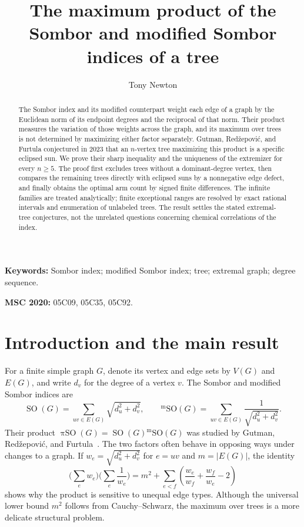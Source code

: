 \documentclass[11pt,a4paper]{article}
\title{The maximum product of the Sombor and modified Sombor indices of a tree}
\author{Tony Newton}
\date{}
\numberwithin{equation}{section}
\newcommand{\somb}{\operatorname{SO}}
\newcommand{\msomb}{\operatorname{{}^m SO}}
\newcommand{\prodso}{\operatorname{\pi SO}}
\begin{document}
\maketitle
\vspace{-2.0em}
\begin{abstract}
The Sombor index and its modified counterpart weight each edge of a graph by the Euclidean norm of its endpoint degrees and the reciprocal of that norm. Their product measures the variation of those weights across the graph, and its maximum over trees is not determined by maximizing either factor separately. Gutman, Red\v{z}epovi\'{c}, and Furtula conjectured in 2023 that an $n$-vertex tree maximizing this product is a specific eclipsed sun. We prove their sharp inequality and the uniqueness of the extremizer for every $n\geq5$. The proof first excludes trees without a dominant-degree vertex, then compares the remaining trees directly with eclipsed suns by a nonnegative edge defect, and finally obtains the optimal arm count by signed finite differences. The infinite families are treated analytically; finite exceptional ranges are resolved by exact rational intervals and enumeration of unlabeled trees. The result settles the stated extremal-tree conjectures, not the unrelated questions concerning chemical correlations of the index.
\end{abstract}
\noindent\textbf{Keywords:} Sombor index; modified Sombor index; tree; extremal graph; degree sequence.\par
\noindent\textbf{MSC 2020:} 05C09, 05C35, 05C92.

\section{Introduction and the main result}
For a finite simple graph $G$, denote its vertex and edge sets by $V(G)$ and $E(G)$, and write $d_v$ for the degree of a vertex $v$. The Sombor and modified Sombor indices are
\begin{equation}\label{eq:indices}
\somb(G)=\sum_{uv\in E(G)}\sqrt{d_u^2+d_v^2},\qquad
\msomb(G)=\sum_{uv\in E(G)}\frac1{\sqrt{d_u^2+d_v^2}}.
\end{equation}
Their product $\prodso(G)=\somb(G)\msomb(G)$ was studied by Gutman, Red\v{z}epovi\'{c}, and Furtula~\cite{GRF2023}. The two factors often behave in opposing ways under changes to a graph. If $w_e=\sqrt{d_u^2+d_v^2}$ for $e=uv$ and $m=|E(G)|$, the identity
\begin{equation}\label{eq:dispersion}
\biggl(\sum_e w_e\biggr)\biggl(\sum_e\frac1{w_e}\biggr)
=m^2+\sum_{e<f}\left(\frac{w_e}{w_f}+\frac{w_f}{w_e}-2\right)
\end{equation}
shows why the product is sensitive to unequal edge types. Although the universal lower bound $m^2$ follows from Cauchy--Schwarz, the maximum over trees is a more delicate structural problem.
\end{document}
